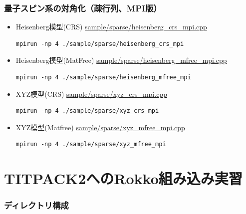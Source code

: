 \begin{frame}[c,fragile]
  \frametitle{量子スピン系の対角化（疎行列、MPI版）}
  \begin{itemize}
  \item Heisenberg模型(CRS) \href{https://github.com/t-sakashita/rokko/blob/master/sample_anasazi/heisenberg_crs_mpi.cpp}{sample/sparse/heisenberg\_crs\_mpi.cpp}
\begin{lstlisting}[style=shstyle]
mpirun -np 4 ./sample/sparse/heisenberg_crs_mpi
\end{lstlisting}
  \item Heisenberg模型(MatFree) \href{https://github.com/t-sakashita/rokko/blob/master/sample_anasazi/heisenberg_mfree_mpi.cpp}{sample/sparse/heisenberg\_mfree\_mpi.cpp}
\begin{lstlisting}[style=shstyle]
mpirun -np 4 ./sample/sparse/heisenberg_mfree_mpi
\end{lstlisting}
  \item XYZ模型(CRS) \href{https://github.com/t-sakashita/rokko/blob/master/sample/sparse/xyz_crs_mpi.cpp}{sample/sparse/xyz\_crs\_mpi.cpp}
\begin{lstlisting}[style=shstyle]
mpirun -np 4 ./sample/sparse/xyz_crs_mpi
\end{lstlisting}
  \item XYZ模型(Matfree) \href{https://github.com/t-sakashita/rokko/blob/master/sample/sparses/xyz_mfree_mpi.cpp}{sample/sparse/xyz\_mfree\_mpi.cpp}
\begin{lstlisting}[style=shstyle]
mpirun -np 4 ./sample/sparse/xyz_mfree_mpi
\end{lstlisting}
  \end{itemize}
\end{frame}

\section{TITPACK2へのRokko組み込み実習}


\begin{frame}[c,fragile]
  \frametitle{ディレクトリ構成}

\end{frame}


